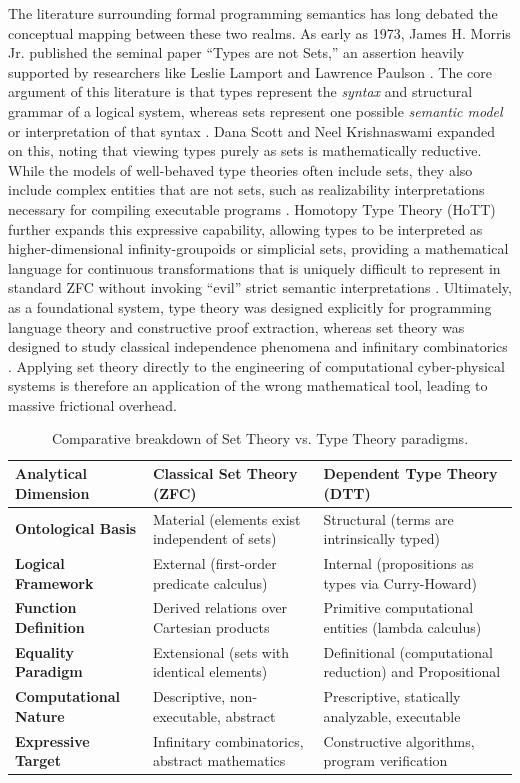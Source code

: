 \documentclass[11pt]{article}
\begin{document}
The literature surrounding formal programming semantics has long debated the conceptual mapping between these two realms. As early as 1973, James H. Morris Jr. published the seminal paper ``Types are not Sets,'' an assertion heavily supported by researchers like Leslie Lamport and Lawrence Paulson \parencite{Ref31, Ref32, Ref33, Ref34, Ref35}. The core argument of this literature is that types represent the \textit{syntax} and structural grammar of a logical system, whereas sets represent one possible \textit{semantic model} or interpretation of that syntax \parencite{Ref24}. Dana Scott and Neel Krishnaswami expanded on this, noting that viewing types purely as sets is mathematically reductive. While the models of well-behaved type theories often include sets, they also include complex entities that are not sets, such as realizability interpretations necessary for compiling executable programs \parencite{Ref24}. Homotopy Type Theory (HoTT) further expands this expressive capability, allowing types to be interpreted as higher-dimensional infinity-groupoids or simplicial sets, providing a mathematical language for continuous transformations that is uniquely difficult to represent in standard ZFC without invoking ``evil'' strict semantic interpretations \parencite{Ref17}. Ultimately, as a foundational system, type theory was designed explicitly for programming language theory and constructive proof extraction, whereas set theory was designed to study classical independence phenomena and infinitary combinatorics \parencite{Ref17}. Applying set theory directly to the engineering of computational cyber-physical systems is therefore an application of the wrong mathematical tool, leading to massive frictional overhead.

\begin{table}[h]
\centering
\renewcommand{\arraystretch}{1.3}
\begin{tabularx}{\textwidth}{@{}l X X@{}}
\toprule
\textbf{Analytical Dimension} & \textbf{Classical Set Theory (ZFC)} & \textbf{Dependent Type Theory (DTT)} \\
\midrule
\textbf{Ontological Basis} & Material (elements exist independent of sets) & Structural (terms are intrinsically typed) \\
\textbf{Logical Framework} & External (first-order predicate calculus) & Internal (propositions as types via Curry-Howard) \\
\textbf{Function Definition} & Derived relations over Cartesian products & Primitive computational entities (lambda calculus) \\
\textbf{Equality Paradigm} & Extensional (sets with identical elements) & Definitional (computational reduction) and Propositional \\
\textbf{Computational Nature} & Descriptive, non-executable, abstract & Prescriptive, statically analyzable, executable \\
\textbf{Expressive Target} & Infinitary combinatorics, abstract mathematics & Constructive algorithms, program verification \\
\bottomrule
\end{tabularx}
\caption{Comparative breakdown of Set Theory vs. Type Theory paradigms.}
\end{table}
\end{document}
